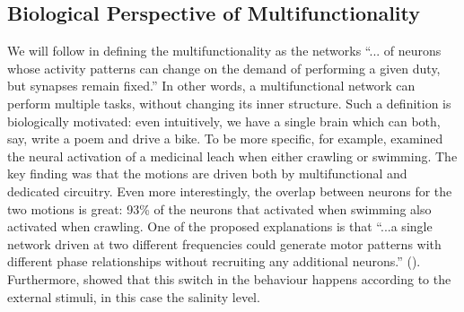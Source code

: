 \subsection*{Biological Perspective of Multifunctionality}
We will follow \cite{flynnMultifunctionalityReservoirComputer2021a} in defining the multifunctionality as the networks ``...  of neurons whose activity patterns can change on the demand of performing a given duty, but synapses remain fixed.'' In other words, a multifunctional network can perform multiple tasks, without changing its inner structure. Such a definition is biologically motivated: even intuitively, we have a single brain which can both, say, write a poem and drive a bike. To be more specific, for example, \cite{briggmanImagingDedicatedMultifunctional2006} examined the neural activation of a medicinal leach when either crawling or swimming. The key finding was that the motions are driven both by multifunctional and dedicated circuitry. Even more interestingly, the overlap between neurons for the two motions is great: 93\% of the neurons that activated when swimming also activated when crawling. One of the proposed explanations is that ``...a single network driven at two different frequencies could generate motor patterns with different phase relationships without recruiting any additional neurons.'' (\cite{briggmanImagingDedicatedMultifunctional2006}). Furthermore, \cite{eschEvidenceSequentialDecision2002} showed that this switch in the behaviour happens according to the external stimuli, in this case the salinity level.
